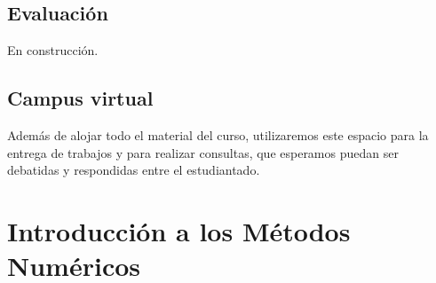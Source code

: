 \documentclass[]{book}
\begin{document}
\hypertarget{evaluaciuxf3n}{%
\section*{Evaluación}\label{evaluaciuxf3n}}

En construcción.

\hypertarget{campus-virtual}{%
\section*{Campus virtual}\label{campus-virtual}}

Además de alojar todo el material del curso, utilizaremos este espacio para la entrega de trabajos y para realizar consultas, que esperamos puedan ser debatidas y respondidas entre el estudiantado.

\hypertarget{introducciuxf3n-a-los-muxe9todos-numuxe9ricos}{%
\chapter{Introducción a los Métodos Numéricos}\label{introducciuxf3n-a-los-muxe9todos-numuxe9ricos}}
\end{document}
